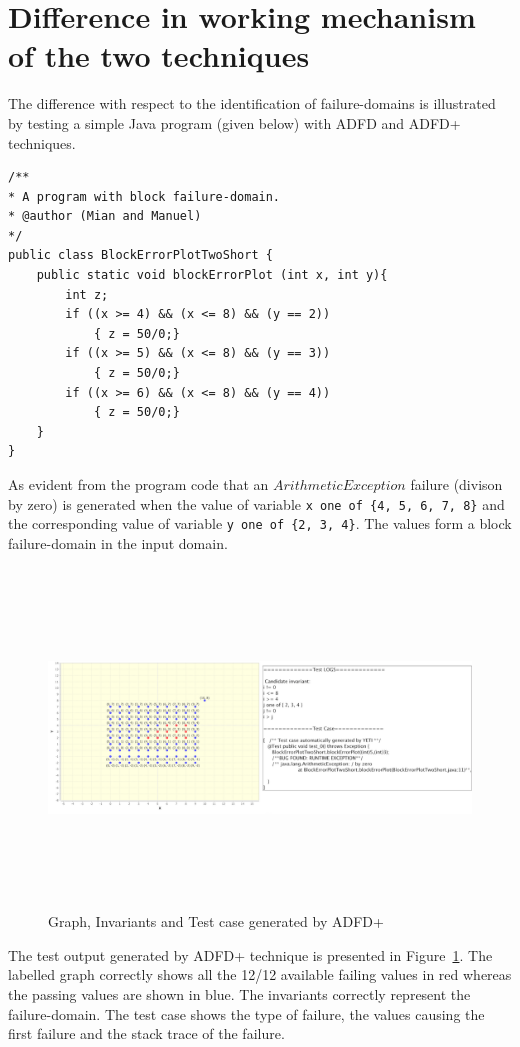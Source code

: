 \section{Difference in working mechanism of the two techniques}
The difference with respect to the identification of failure-domains is illustrated by testing a simple Java program (given below) with ADFD and ADFD+ techniques. 
\smallskip
\begin{lstlisting}
/** 
* A program with block failure-domain.
* @author (Mian and Manuel)
*/
public class BlockErrorPlotTwoShort {
	public static void blockErrorPlot (int x, int y){
		int z;
		if ((x >= 4) && (x <= 8) && (y == 2))
			{ z = 50/0;}
		if ((x >= 5) && (x <= 8) && (y == 3))
			{ z = 50/0;}
		if ((x >= 6) && (x <= 8) && (y == 4))
			{ z = 50/0;}
	}
}
\end{lstlisting}
\smallskip
As evident from the program code that an $ArithmeticException$ failure (divison by zero) is generated when the value of variable \verb+x one of {4, 5, 6, 7, 8}+ and the corresponding value of variable \verb+y one of {2, 3, 4}+. The values form a block failure-domain in the input domain. 
\bigskip
\begin{figure}[H]
\centering
\includegraphics[width= 15.5cm,height=9cm]{chapter7/adfdPlusCombined.png}
\bigskip
\caption{Graph, Invariants and Test case generated by ADFD+}
\label{fig:ADFD+}
\end{figure}
\bigskip

The test output generated by ADFD+ technique is presented in Figure~\ref{fig:ADFD+}. The labelled graph correctly shows all the 12/12 available failing values in red whereas the passing values are shown in blue. The invariants correctly represent the failure-domain. The test case shows the type of failure, the values causing the first failure and the stack trace of the failure.


